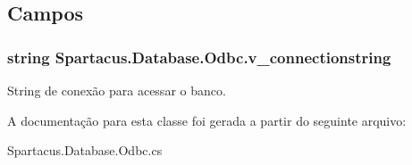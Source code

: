 \subsection{Campos}
\hypertarget{classSpartacus_1_1Database_1_1Odbc_a4f31d12ddac65ac9ce6ab02eb7fbced8}{
\subsubsection[{v\+\_\+connectionstring}]{\setlength{\rightskip}{0pt plus 5cm}string Spartacus.\+Database.\+Odbc.\+v\+\_\+connectionstring}}\label{classSpartacus_1_1Database_1_1Odbc_a4f31d12ddac65ac9ce6ab02eb7fbced8}


String de conexão para acessar o banco. 



A documentação para esta classe foi gerada a partir do seguinte arquivo\+:\begin{DoxyCompactItemize}
\item 
Spartacus.\+Database.\+Odbc.\+cs\end{DoxyCompactItemize}
